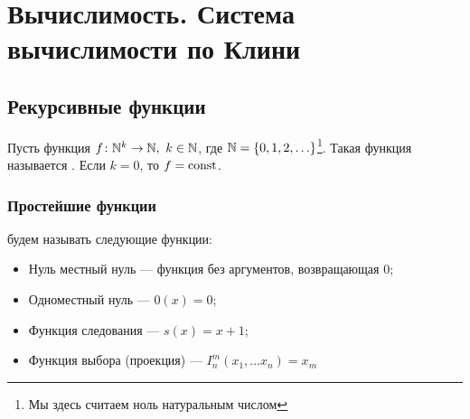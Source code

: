 \chapter{Вычислимость. Система вычислимости по Клини} 
\section{Рекурсивные функции}

\begin{defn}[]
	Пусть функция $ f\colon \mathbb{N}^{k} \to  \mathbb{N}, ~ k \in \mathbb{N}$, где $ \mathbb{N} = \{0, 1, 2, \ldots \}$\footnote{Мы здесь считаем ноль натуральным числом}. Такая функция называется . Если $ k = 0$, то $ f = \textmd{const}$.
\end{defn}

\subsection{Простейшие функции} 
 будем называть следующие функции:
\begin{itemize}
	\item Нуль местный нуль --- функция без аргументов, возвращающая $ 0$;
	\item Одноместный нуль --- $ 0(x) = 0$;
	\item Функция следования --- $ s(x) = x + 1$;
	\item Функция выбора (проекция) ---  $ I_{n}^{m}(x_1, \ldots x_{n}) = x_m$
\end{itemize}



